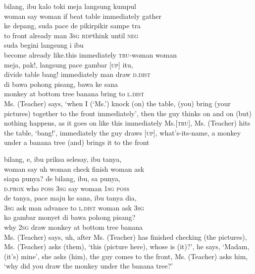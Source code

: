 \ea
{}    {bilang,}    {ibu}    {kalo}    {toki}    {meja}    {langsung}   kumpul\\
   {woman}    {say}    {woman}    {if}    {beat}    {table}    {immediately}   gather\\
\gll ke    {depang,}    {suda}    {pace}    {de}    {pikir{\Tilde}pikir}    {sampe}    {tra}\\
  to    {front}    {already}    {man}    {\textsc{3sg}}    {\textsc{rdp}{\Tilde}think}    {until}    {\textsc{neg}}\\
    {suda}    {begini}    {langsung}    {i}    {ibu}\\
   {become}    {already}    {like.this}    {immediately}    {\textsc{tru}{}-woman}    {woman}\\
    {meja,}    {pak!,}    {langsung}    {pace}    {gambar}    {\upshape\textsc{[up]}}    {itu,}\\
   {divide}    {table}    {bang!}    {immediately}    {man}    {draw}    {}    {\textsc{d.dist}}\\
   di    {bawa}    {pohong}    {pisang,}    {bawa}   ke    {sana}\\
   {monkey}   at    {bottom}    {tree}    {banana}    {bring}   to    {\textsc{l.dist}}\\
\glt
Ms. (Teacher) says, ‘when I (‘Ms.’) knock (on) the table, (you) bring (your pictures) together to the front immediately’, then the guy thinks on and on (but) nothing happens, as it goes on like this immediately Ms.[\textsc{tru}], Ms. (Teacher) hits the table, ‘bang!’, immediately the guy draws [\textsc{up}], what’s-its-name, a monkey under a banana tree (and) brings it to the front
\z

\ea
{}    {bilang,}    {e,}    {ibu}    {priksa}    {selesay,}    {ibu}    {tanya,}\\
   {woman}    {say}    {uh}    {woman}    {check}    {finish}    {woman}    {ask}\\
    {siapa}    {punya?}    {de}    {bilang,}    {ibu,}    {sa}    {punya,}\\
   {\textsc{d.prox}}    {who}    {\textsc{poss}}    {\textsc{3sg}}    {say}    {woman}    {\textsc{1sg}}    {\textsc{poss}}\\
\gll de    {tanya,}    {pace}    {maju}    {ke}    {sana,}    {ibu}    {tanya}   dia,\\
  \textsc{3sg}    {ask}    {man}    {advance}    {to}    {\textsc{l.dist}}    {woman}    {ask}   \textsc{3sg}\\
    {ko}    {gambar}    {monyet}    {di}    {bawa}    {pohong}    {pisang?}\\
   {why}    {\textsc{2sg}}    {draw}    {monkey}    {at}    {bottom}    {tree}    {banana}\\
\glt
Ms. (Teacher) says, uh, after Ms. (Teacher) has finished checking (the pictures), Ms. (Teacher) asks (them), ‘this (picture here), whose is (it)?’, he says, ‘Madam, (it’s) mine’, she asks (him), the guy comes to the front, Ms. (Teacher) asks him, ‘why did you draw the monkey under the banana tree?’
\z

